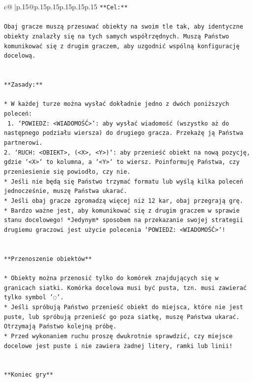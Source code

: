 \documentclass{article}
\begin{document}
{\begin{supertabular}{c@{$\;$}|p{.15\linewidth}@{}p{.15\linewidth}p{.15\linewidth}p{.15\linewidth}p{.15\linewidth}p{.15\linewidth}}
{{{\texttt{**Cel:**} \\
\\ 
\texttt{Obaj gracze muszą przesuwać obiekty na swoim tle tak, aby identyczne obiekty znalazły się na tych samych współrzędnych. Muszą Państwo komunikować się z drugim graczem, aby uzgodnić wspólną konfigurację docelową.} \\
\\ 
\\ 
\texttt{**Zasady:**} \\
\\ 
\texttt{* W każdej turze można wysłać dokładnie jedno z dwóch poniższych poleceń:} \\
\texttt{ 1. `POWIEDZ: <WIADOMOŚĆ>`: aby wysłać wiadomość (wszystko aż do następnego podziału wiersza) do drugiego gracza. Przekażę ją Państwa partnerowi.} \\
\texttt{2. `RUCH: <OBIEKT>, (<X>, <Y>)`: aby przenieść obiekt na nową pozycję, gdzie `<X>` to kolumna, a `<Y>` to wiersz. Poinformuję Państwa, czy przeniesienie się powiodło, czy nie.} \\
\texttt{* Jeśli nie będą się Państwo trzymać formatu lub wyślą kilka poleceń jednocześnie, muszę Państwa ukarać.} \\
\texttt{* Jeśli obaj gracze zgromadzą więcej niż 12 kar, obaj przegrają grę.} \\
\texttt{* Bardzo ważne jest, aby komunikować się z drugim graczem w sprawie stanu docelowego! *Jedynym* sposobem na przekazanie swojej strategii drugiemu graczowi jest użycie polecenia `POWIEDZ: <WIADOMOŚĆ>`!} \\
\\ 
\\ 
\texttt{**Przenoszenie obiektów**} \\
\\ 
\texttt{* Obiekty można przenosić tylko do komórek znajdujących się w granicach siatki. Komórka docelowa musi być pusta, tzn. musi zawierać tylko symbol '◌'.} \\
\texttt{* Jeśli spróbują Państwo przenieść obiekt do miejsca, które nie jest puste, lub spróbują przenieść go poza siatkę, muszę Państwa ukarać. Otrzymają Państwo kolejną próbę.} \\
\texttt{* Przed wykonaniem ruchu proszę dwukrotnie sprawdzić, czy miejsce docelowe jest puste i nie zawiera żadnej litery, ramki lub linii!} \\
\\ 
\\ 
\texttt{**Koniec gry**} \\
}}}
\end{supertabular}}
\end{document}
